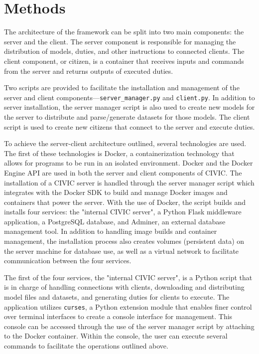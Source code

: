 \documentclass[11pt]{article}
\begin{document}
\section{Methods}

The architecture of the framework can be split into two main components: the server and the client. The server component is responsible for managing the distribution of models, duties, and other instructions to connected clients. The client component, or citizen, is a container that receives inputs and commands from the server and returns outputs of executed duties.

Two scripts are provided to facilitate the installation and management of the server and client components---\verb|server_manager.py| and \verb|client.py|. In addition to server installation, the server manager script is also used to create new models for the server to distribute and parse/generate datasets for those models. The client script is used to create new citizens that connect to the server and execute duties.

To achieve the server-client architecture outlined, several technologies are used. The first of these technologies is Docker, a containerization technology that allows for programs to be run in an isolated environment. Docker and the Docker Engine API are used in both the server and client components of CIVIC. The installation of a CIVIC server is handled through the server manager script which integrates with the Docker SDK to build and manage Docker images and containers that power the server. With the use of Docker, the script builds and installs four services: the "internal CIVIC server", a Python Flask middleware application, a PostgreSQL database, and Adminer, an external database management tool. In addition to handling image builds and container management, the installation process also creates volumes (persistent data) on the server machine for database use, as well as a virtual network to facilitate communication between the four services. 

The first of the four services, the "internal CIVIC server", is a Python script that is in charge of handling connections with clients, downloading and distributing model files and datasets, and generating duties for clients to execute. The application utilizes \verb|curses|, a Python extension module that enables finer control over terminal interfaces to create a console interface for management. This console can be accessed through the use of the server manager script by attaching to the Docker container. Within the console, the user can execute several commands to facilitate the operations outlined above. 
\end{document}
